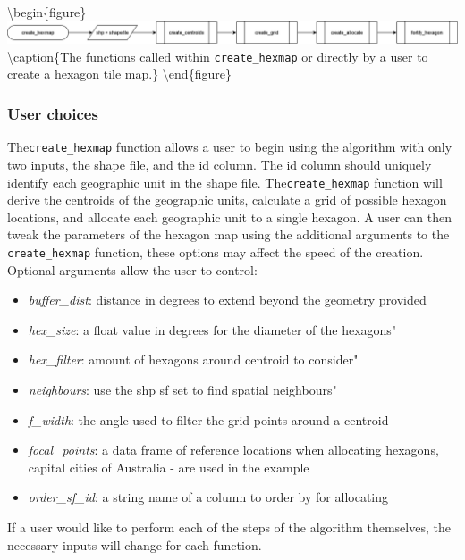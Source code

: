 \documentclass{monashthesis}
\begin{document}
\textbackslash begin\{figure\}
\includegraphics[width=14cm]{figures/03-algorithm/sugarbag_horizontal.png}
\textbackslash caption\{\label{fig:sugarbag_horizontal}The functions called within \texttt{create\_hexmap} or directly by a user to create a hexagon tile map.\}
\textbackslash end\{figure\}

\hypertarget{user-choices}{%
\subsubsection{User choices}\label{user-choices}}

The\texttt{create\_hexmap} function allows a user to begin using the algorithm with only two inputs, the shape file, and the id column. The id column should uniquely identify each geographic unit in the shape file.
The\texttt{create\_hexmap} function will derive the centroids of the geographic units, calculate a grid of possible hexagon locations, and allocate each geographic unit to a single hexagon.
A user can then tweak the parameters of the hexagon map using the additional arguments to the \texttt{create\_hexmap} function, these options may affect the speed of the creation. Optional arguments allow the user to control:

\begin{itemize}
\tightlist
\item
  \emph{buffer\_dist}: distance in degrees to extend beyond the geometry provided
\item
  \emph{hex\_size}: a float value in degrees for the diameter of the hexagons"
\item
  \emph{hex\_filter}: amount of hexagons around centroid to consider"
\item
  \emph{neighbours}: use the shp sf set to find spatial neighbours"
\item
  \emph{f\_width}: the angle used to filter the grid points around a centroid
\item
  \emph{focal\_points}: a data frame of reference locations when allocating hexagons, capital cities of Australia - are used in the example
\item
  \emph{order\_sf\_id}: a string name of a column to order by for allocating
\end{itemize}

If a user would like to perform each of the steps of the algorithm themselves, the necessary inputs will change for each function.
\end{document}
